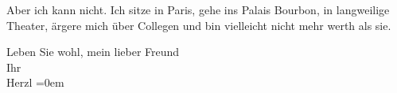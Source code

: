 \pstart
           Aber ich kann nicht. Ich sitze in Paris, gehe ins
                  Palais Bourbon, in langweilige Theater,
               ärgere mich über Collegen und bin vielleicht nicht mehr werth als sie.\pend
           
\pstart
           Leben Sie wohl, mein lieber Freund {\\[\baselineskip]}Ihr {\\[\baselineskip]}\spacefill\mbox{Herzl}\pend
           \leftskip=0em{}\endnumbering{}
\begin{anhang}
\end{anhang}\newcommand{\dateiname}{L03848}\newcommand{\titel}{Theodor Herzl an Arthur Schnitzler, 16. 2. 1895}\newcommand{\editorInnen}{Selma Jahnke und Martin Anton Müller}
